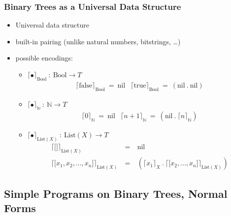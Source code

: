 \documentclass{beamer}
\begin{document}
\begin{frame}
  \frametitle{Binary Trees as a Universal Data Structure}
  \begin{itemize}
    \item Universal data structure 
    \item built-in pairing (unlike natural numbers, bitstrings, \ldots)
    \item possible encodings:
    \begin{itemize}
	  \item $\lceil \bullet \rceil_{\text{Bool}} ~:~ \text{Bool} \rightarrow T$
	  \[
	    \begin{array}{cc}
	    \lceil \text{false} \rceil_{\text{Bool}} ~=~ \text{nil}
	    &
	    \lceil \text{true} \rceil_{\text{Bool}} ~=~ (\text{nil} ~.~ \text{nil})
	    \end{array}
	  \]
	  
	  \item $\lceil \bullet \rceil_{\mathbb{N}} ~:~ \mathbb{N} \rightarrow T$
	  \[
	    \begin{array}{cc}
	    \lceil 0 \rceil_{\mathbb{N}} ~=~ \text{nil}
	    &
	    \lceil n+1 \rceil_{\mathbb{N}} ~=~ (\text{nil} ~.~ \lceil n \rceil_{\mathbb{N}})
	    \end{array}
	  \]
	  
	  \item $\lceil \bullet \rceil_{\text{List}(X)} ~:~ \text{List}(X) \rightarrow T$
	  \[
	    \begin{array}{lcl}
	    \lceil \lbrack\rbrack \rceil_{\text{List}(X)} & ~=~ & \text{nil}
	    \\
	    \lceil \lbrack x_1, x_2, \ldots, x_n \rbrack \rceil_{\text{List}(X)} 
	      & ~=~ & (\lceil x_1 \rceil_{X} ~.~ \lceil \lbrack x_2, \ldots, x_n \rbrack \rceil_{\text{List}(X)})
	    \end{array}
	  \]
    \end{itemize}
  \end{itemize}
\end{frame}

\subsection{Simple Programs on Binary Trees, Normal Forms}
\end{document}
